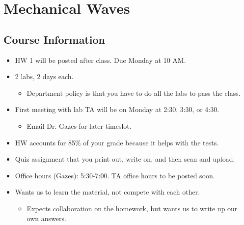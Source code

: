 \documentclass[../notes.tex]{subfiles}
\begin{document}
\chapter{Mechanical Waves}
\section{Course Information}
\begin{itemize}
    \item {}HW 1 will be posted after class. Due Monday at 10 AM.
    \item 2 labs, 2 days each.
    \begin{itemize}
        \item Department policy is that you have to do all the labs to pass the class.
    \end{itemize}
    \item First meeting with lab TA will be on Monday at 2:30, 3:30, or 4:30.
    \begin{itemize}
        \item Email Dr. Gazes for later timeslot.
    \end{itemize}
    \item HW accounts for 85\% of your grade because it helps with the tests.
    \item Quiz assignment that you print out, write on, and then scan and upload.
    \item Office hours (Gazes): 5:30-7:00. TA office hours to be posted soon.
    \item Wants us to learn the material, not compete with each other.
    \begin{itemize}
        \item Expects collaboration on the homework, but wants us to write up our own answers.
    \end{itemize}
\end{itemize}
\end{document}
